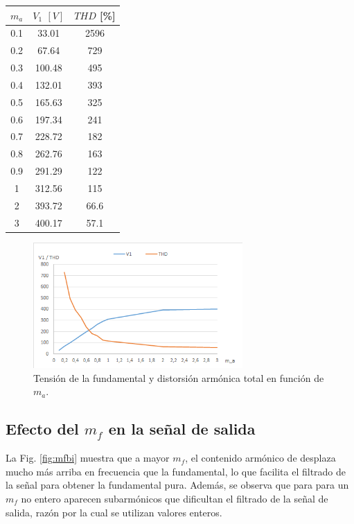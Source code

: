 \documentclass[conference]{IEEEtran}
\begin{document}
\begin{center}
\begin{tabular}{|c|c|c|}
		\hline
	$m_a$& $V_1$ $[V]$ & $THD$ [\%] \\ 
	\hline 
	0.1 & 33.01 & 2596 \\ 
	0.2	& 67.64 & 729\\ 
	0.3	& 100.48 & 495 \\ 
	0.4 & 132.01 & 393 \\ 
	0.5 & 165.63 & 325 \\ 
	0.6 & 197.34 & 241 \\ 
	0.7 & 228.72 & 182 \\ 
	0.8 & 262.76 & 163 \\ 
	0.9 & 291.29 & 122 \\ 
	1 & 312.56 & 115 \\ 
	2 & 393.72 & 66.6 \\ 
	3 & 400.17 & 57.1 \\ 
	\hline 
\end{tabular} 
\end{center} 

\begin{figure}[t]
	\centering
	\includegraphics[width=8cm]{imagenes/bipolar/thd}
	\caption{Tensión de la fundamental y distorsión armónica total en función de $m_a$.}
	\label{fig:thdbi}
\end{figure}

\subsection{Efecto del $m_f$ en la señal de salida}
La Fig. \ref{fig:mfbi} muestra que a mayor $m_f$, el contenido armónico de desplaza mucho más arriba en
frecuencia que la fundamental, lo que facilita el filtrado de la señal para obtener la fundamental pura. Además, se observa que para para un $m_f$ no entero aparecen subarmónicos que dificultan el filtrado de la señal de salida, razón por la cual se utilizan valores enteros.
\end{document}
